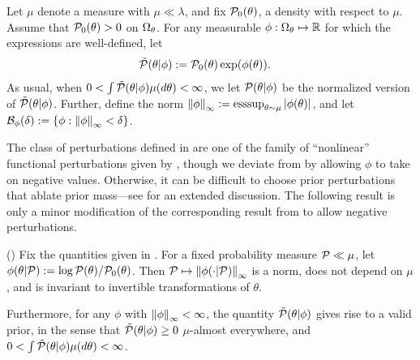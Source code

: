 \begin{defn}
%
Let $\mu$ denote a measure with $\mu \ll \lambda$, and fix $\mathcal{P}_{0}(\theta)$, a
density with respect to $\mu$.  Assume that $\mathcal{P}_{0}(\theta) > 0$ on $\Omega_{\theta}$.
For any measurable $\phi: \Omega_{\theta} \mapsto \mathbb{R}$ for which the
expressions are well-defined, let
%
\begin{align*}
\ptil(\theta \vert \phi) :={}& \pbase(\theta)\exp(\phi(\theta)).
%
\end{align*}
%
As usual, when $0 < \int \tilde{\mathcal{P}}(\theta \vert \phi) \mu(d\theta) < \infty$, we let
$\mathcal{P}(\theta \vert \phi)$ be the normalized version of $\tilde{\mathcal{P}}(\theta \vert \phi)$.
Further, define the norm $\left\Vert\phi\right\Vert_{\infty} := \operatorname*{\mathrm{esssup}}_{\theta \sim \mu}
\left|\phi(\theta)\right|$, and let $\mathcal{B}_\phi(\delta) := \left\{ \phi: \left\Vert\phi\right\Vert_{\infty} <
\delta \right\}$.
%
\end{defn}
%

The class of perturbations defined in  are one of the
family of ``nonlinear'' functional perturbations given by
\citet{gustafson:1996:local}, though we deviate from
\citet{gustafson:1996:local} by allowing $\phi$ to take on negative values.
Otherwise, it can be difficult to choose prior perturbations that ablate prior
mass---see  for an extended discussion.  The following
result is only a minor modification of the corresponding result from
\citet{gustafson:1996:local} to allow negative perturbations.

\begin{lem}
%
(\citet{gustafson:1996:local})
%
Fix the quantities given in .  For a fixed probability
measure $\mathcal{P} \ll \mu$, let $\phi(\theta \vert \mathcal{P}) := \log \mathcal{P}(\theta) /
\mathcal{P}_{0}(\theta)$.  Then $\mathcal{P} \mapsto \left\Vert\phi(\cdot \vert \mathcal{P})\right\Vert_{\infty}$ is a
norm, does not depend on $\mu$, and is invariant to invertible transformations
of $\theta$.

Furthermore, for any $\phi$ with $\left\Vert\phi\right\Vert_{\infty} < \infty$, the quantity
$\tilde{\mathcal{P}}(\theta \vert \phi)$ gives rise to a valid prior, in the sense that
$\tilde{\mathcal{P}}(\theta \vert \phi) \ge 0$ $\mu$-almost everywhere, and
$0 < \int \tilde{\mathcal{P}}(\theta \vert \phi) \mu(d\theta) < \infty$.
%
%
\end{lem}

